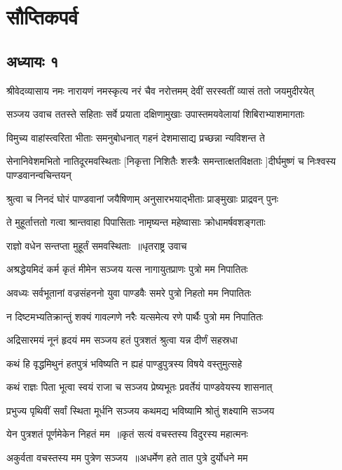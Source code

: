 \part{सौप्तिकपर्व}
\chapter{अध्यायः १}
\threelineshloka
{श्रीवेदव्यासाय नमः}
{नारायणं नमस्कृत्य नरं चैव नरोत्तमम्}
{देवीं सरस्वतीं व्यासं ततो जयमुदीरयेत्}


\threelineshloka
{सञ्जय उवाच}
{ततस्ते सहिताः सर्वे प्रयाता दक्षिणामुखाः}
{उपास्तमयवेलायां शिबिराभ्याशमागताः}


\twolineshloka
{विमुच्य वाहांस्त्वरिता भीताः समनुबोधनात्}
{गहनं देशमासाद्य प्रच्छन्ना न्यविशन्त ते}


\threelineshloka
{सेनानिवेशमभितो नातिदूरमवस्थिताः}
{[निकृत्ता निशितैः शस्त्रैः समन्तात्क्षतविक्षताः}
{]दीर्घमुष्णं च निःश्वस्य पाण्डवानन्वचिन्तयन्}


\twolineshloka
{श्रुत्वा च निनदं घोरं पाण्डवानां जयैषिणाम्}
{अनुसारभयाद्भीताः प्राङ्मुखाः प्राद्रवन् पुनः}


\twolineshloka
{ते मुहूर्तात्ततो गत्वा श्रान्तवाहा पिपासिताः}
{नामृष्यन्त महेष्वासाः क्रोधामर्षवशङ्गताः}


\twolineshloka
{राज्ञो वधेन सन्तप्ता मुहूर्तं समवस्थिताः ॥धृतराष्ट्र उवाच}
{}


\twolineshloka
{अश्रद्धेयमिदं कर्म कृतं मीमेन सञ्जय}
{यत्स नागायुतप्राणः पुत्रो मम निपातितः}


\twolineshloka
{अवध्यः सर्वभूतानां वज्रसंहननो युवा}
{पाण्डवैः समरे पुत्रो निहतो मम निपातितः}


\twolineshloka
{न दिष्टमभ्यतिक्रान्तुं शक्यं गावल्गणे नरैः}
{यत्समेत्य रणे पार्थैः पुत्रो मम निपातितः}


\twolineshloka
{अद्रिसारमयं नूनं हृदयं मम सञ्जय}
{हतं पुत्रशतं श्रुत्वा यन्न दीर्णं सहस्रधा}


\twolineshloka
{कथं हि वृद्धमिथुनं हतपुत्रं भविष्यति}
{न ह्यहं पाण्डुपुत्रस्य विषये वस्तुमुत्सहे}


\twolineshloka
{कथं राज्ञः पिता भूत्वा स्वयं राजा च सञ्जय}
{प्रेष्यभूतः प्रवर्तेयं पाण्डवेयस्य शासनात्}


\threelineshloka
{प्रभुज्य पृथिवीं सर्वां स्थिता मूर्धनि सञ्जय}
{कथमद्य भविष्यामि श्रोतुं शक्ष्यामि सञ्जय}
{}


\twolineshloka
{येन पुत्रशतं पूर्णमेकेन निहतं मम ॥कृतं सत्यं वचस्तस्य विदुरस्य महात्मनः}
{}


\twolineshloka
{अकुर्वता वचस्तस्य मम पुत्रेण सञ्जय ॥अधर्मेण हते तात पुत्रे दुर्योधने मम}
{}


